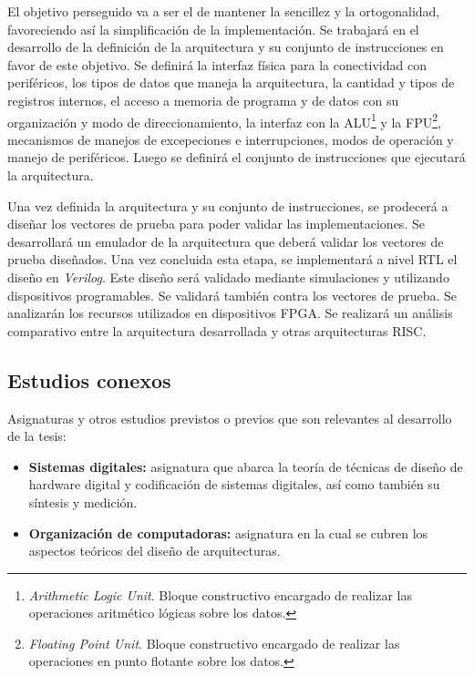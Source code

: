\documentclass[a4paper]{article}
\begin{document}
El objetivo perseguido va a ser el de mantener la sencillez y la ortogonalidad, favoreciendo así la simplificación de la implementación. Se trabajará en el desarrollo de la definición de la arquitectura y su conjunto de instrucciones en favor de este objetivo. Se definirá la interfaz física para la conectividad con periféricos, los tipos de datos que maneja la arquitectura, la cantidad y tipos de registros internos, el acceso a memoria de programa y de datos con su organización y modo de direccionamiento, la interfaz con la ALU\footnote{\label{ALU} \emph{Arithmetic Logic Unit}. Bloque constructivo encargado de realizar las operaciones aritmético lógicas sobre los datos.} y la FPU\footnote{\label{FPU} \emph{Floating Point Unit}. Bloque constructivo encargado de realizar las operaciones en punto flotante sobre los datos.}, mecanismos de manejos de excepeciones e interrupciones, modos de operación y manejo de periféricos. Luego se definirá el conjunto de instrucciones que ejecutará la arquitectura.

Una vez definida la arquitectura y su conjunto de instrucciones, se prodecerá a diseñar los vectores de prueba para poder validar las implementaciones. Se desarrollará un emulador de la arquitectura que deberá validar los vectores de prueba diseñados. Una vez concluida esta etapa, se implementará a nivel RTL el diseño en \emph{Verilog}. Este diseño será validado mediante simulaciones y utilizando dispositivos programables. Se validará también contra los vectores de prueba. Se analizarán los recursos utilizados en dispositivos FPGA. Se realizará un análisis comparativo entre la arquitectura desarrollada y otras arquitecturas RISC.

\subsection{Estudios conexos}

Asignaturas y otros estudios previstos o previos que son relevantes al desarrollo de la tesis:

\begin{itemize}
	\item \textbf{Sistemas digitales:} asignatura que abarca la teoría de técnicas de diseño de hardware digital y codificación de sistemas digitales, así como también su síntesis y medición.
	\item \textbf{Organización de computadoras:} asignatura en la cual se cubren los aspectos teóricos del diseño de arquitecturas.
\end{itemize}
\end{document}
